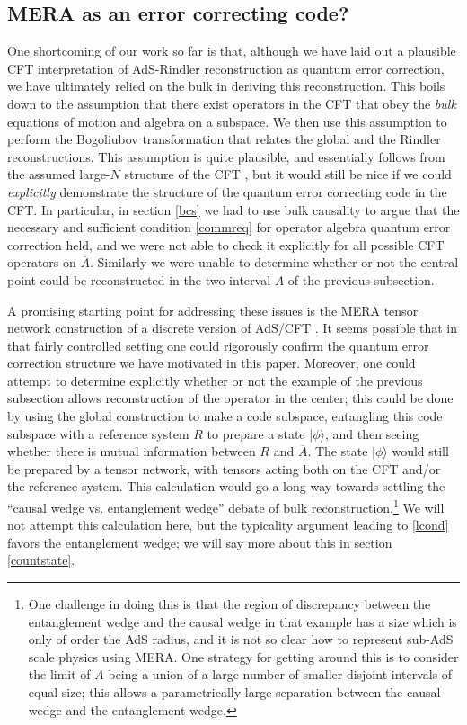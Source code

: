 \documentclass[12pt]{article}
\newcommand{\ran}{\rangle}
\newcommand{\ol}{\overline}
\begin{document}
\subsection{MERA as an error correcting code?}
One shortcoming of our work so far is that, although we have laid out a plausible CFT interpretation of AdS-Rindler reconstruction as quantum error correction, we have ultimately relied on the bulk in deriving this reconstruction.  This boils down to the assumption that there exist operators in the CFT that obey the \textit{bulk} equations of motion and algebra on a subspace.  We then use this assumption to perform the Bogoliubov transformation that relates the global and the Rindler reconstructions.  This assumption is quite plausible, and essentially follows from the assumed large-$N$ structure of the CFT \cite{Heemskerk:2009pn}, but it would still be nice if we could \textit{explicitly} demonstrate the structure of the quantum error correcting code in the CFT.  In particular, in section \ref{bcs} we had to use bulk causality to argue that the necessary and sufficient condition \eqref{commreq} for operator algebra quantum error correction held, and we were not able to check it explicitly for all possible CFT operators on $\ol{A}$.  Similarly we were unable to determine whether or not the central point could be reconstructed in the two-interval $A$ of the previous subsection.  

A promising starting point for addressing these issues is the MERA tensor network construction of a discrete version of AdS/CFT \cite{Vidal:2008zz,Swingle:2009bg,evenbly2011tensor}.  It seems possible that in that fairly controlled setting one could rigorously confirm the quantum error correction structure we have motivated in this paper.  Moreover, one could attempt to determine explicitly whether or not the example of the previous subsection allows reconstruction of the operator in the center; this could be done by using the global construction to make a code subspace, entangling this code subspace with a reference system $R$ to prepare a state $|\phi\ran$, and then seeing whether there is mutual information between $R$ and $\ol{A}$. The state $|\phi\ran$ would still be prepared by a tensor network, with tensors acting both on the CFT and/or the reference system.  This calculation would go a long way towards settling the ``causal wedge vs. entanglement wedge'' debate of bulk reconstruction.\footnote{One challenge in doing this is that the region of discrepancy between the entanglement wedge and the causal wedge in that example has a size which is only of order the AdS radius, and it is not so clear how to represent sub-AdS scale physics using MERA.  One strategy for getting around this is to consider the limit of $A$ being a union of a large number of smaller disjoint intervals of equal size; this allows a parametrically large separation between the causal wedge and the entanglement wedge.}
We will not attempt this calculation here, but the typicality argument leading to \eqref{lcond} favors the entanglement wedge; we will say more about this in section \ref{countstate}.
\end{document}
